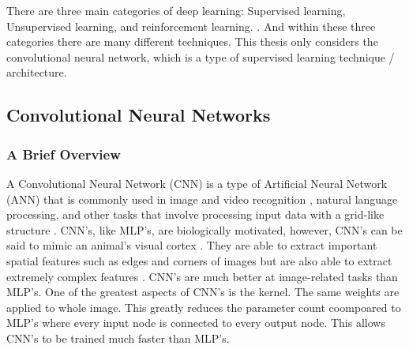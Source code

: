  There are three main categories of deep learning: Supervised learning, Unsupervised learning, and reinforcement learning. \cite{alzubaidi2021review}. And within these three categories there are many different techniques. This thesis only considers the convolutional neural network, which is a type of supervised learning technique / architecture. 

	
\subsection{Convolutional Neural Networks}
\subsubsection*{A Brief Overview}
A Convolutional Neural Network (CNN) is a type of Artificial Neural Network (ANN) that is commonly used in image and video recognition , natural language processing, and other tasks that involve processing input data with a grid-like structure \cite{li2021survey}. CNN's, like MLP's, are biologically motivated, however, CNN's can be said to mimic an animal's visual cortex \cite{angermueller2016deep}. They are  able to extract important spatial features such as edges and corners of images but are also able to extract extremely complex features \cite{KATTENBORN202124}. CNN's are much better at image-related tasks than MLP's. One of the greatest aspects of CNN's is the kernel. The same weights are applied to whole image. This greatly reduces the parameter count coompoared to MLP's where every input node is connected to every output node. This allows CNN's to be trained much faster than MLP's.

